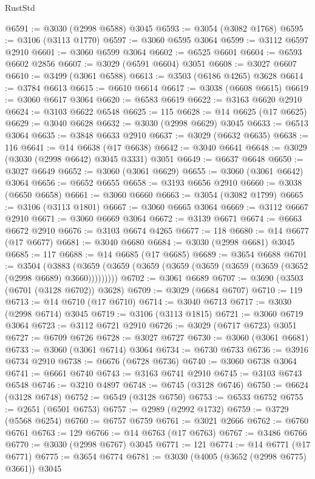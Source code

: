 \begin{lexlean}{RustStd}
\begin{coremodule}
@6591 := @3030 (@2998 @6588) @3045
@6593 := @3054 (@3082 @1768)
@6595 := @3106 (@3113 @1770)
@6597 := @3060 @6595 @3064
@6599 := @3112 @6597 @2910
@6601 := @3060 @6599 @3064
@6602 := @6525 @6601
@6604 := @6593 @6602 @2856
@6607 := @3029 (@6591 @6604) @3051
@6608 := @3027 @6607
@6610 := @3499 (@3061 @6588)
@6613 := @3503 (@6186 @4265) @3628
@6614 := @3784 @6613
@6615 := @6610 @6614
@6617 := @3038 (@6608 @6615)
@6619 := @3060 @6617 @3064
@6620 := @6583 @6619
@6622 := @3163 @6620 @2910
@6624 := @3103 @6622 @6548
@6625 := 115
@6628 := @14 @6625 (@17 @6625)
@6629 := @3040 @6628
@6632 := @3030 (@2998 @6629) @3045
@6633 := @6513 @3064
@6635 := @3848 @6633 @2910
@6637 := @3029 (@6632 @6635)
@6638 := 116
@6641 := @14 @6638 (@17 @6638)
@6642 := @3040 @6641
@6648 := @3029 (@3030 (@2998 @6642) @3045 @3331) @3051
@6649 := @6637 @6648
@6650 := @3027 @6649
@6652 := @3060 (@3061 @6629)
@6655 := @3060 (@3061 @6642) @3064
@6656 := @6652 @6655
@6658 := @3193 @6656 @2910
@6660 := @3038 (@6650 @6658)
@6661 := @3060 @6660
@6663 := @3054 (@3082 @1799)
@6665 := @3106 (@3113 @1801)
@6667 := @3060 @6665 @3064
@6669 := @3112 @6667 @2910
@6671 := @3060 @6669 @3064
@6672 := @3139 @6671
@6674 := @6663 @6672 @2910
@6676 := @3103 @6674 @4265
@6677 := 118
@6680 := @14 @6677 (@17 @6677)
@6681 := @3040 @6680
@6684 := @3030 (@2998 @6681) @3045
@6685 := 117
@6688 := @14 @6685 (@17 @6685)
@6689 := @3654 @6688
@6701 := @3504
    (@3883 (@3659 (@3659 (@3659 (@3659 (@3659 (@3659 (@3659 (@3652 (@2998 @6689) @3660)))))))))
@6702 := @3061 @6689
@6707 := @3690 (@3503 (@6701 (@3128 @6702)) @3628)
@6709 := @3029 (@6684 @6707)
@6710 := 119
@6713 := @14 @6710 (@17 @6710)
@6714 := @3040 @6713
@6717 := @3030 (@2998 @6714) @3045
@6719 := @3106 (@3113 @1815)
@6721 := @3060 @6719 @3064
@6723 := @3112 @6721 @2910
@6726 := @3029 (@6717 @6723) @3051
@6727 := @6709 @6726
@6728 := @3027 @6727
@6730 := @3060 (@3061 @6681)
@6733 := @3060 (@3061 @6714) @3064
@6734 := @6730 @6733
@6736 := @3916 @6734 @2910
@6738 := @6676 (@6728 @6736)
@6740 := @3060 @6738 @3064
@6741 := @6661 @6740
@6743 := @3163 @6741 @2910
@6745 := @3103 @6743 @6548
@6746 := @3210 @4897
@6748 := @6745 (@3128 @6746)
@6750 := @6624 (@3128 @6748)
@6752 := @6549 (@3128 @6750)
@6753 := @6533 @6752
@6755 := @2651 (@6501 @6753)
@6757 := @2989 (@2992 @1732)
@6759 := @3729 (@5568 @6254)
@6760 := @6757 @6759
@6761 := @3021 @2666
@6762 := @6760 @6761
@6763 := 129
@6766 := @14 @6763 (@17 @6763)
@6767 := @3486 @6766
@6770 := @3030 (@2998 @6767) @3045
@6771 := 121
@6774 := @14 @6771 (@17 @6771)
@6775 := @3654 @6774
@6781 := @3030 (@4005 (@3652 (@2998 @6775) @3661)) @3045

\end{coremodule}
\end{lexlean}

